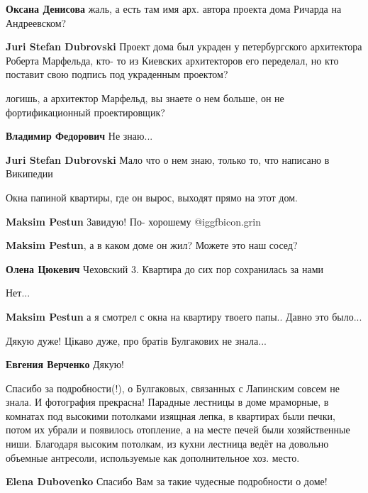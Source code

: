 \begin{itemize}
\begin{itemize}
\textbf{Оксана Денисова} жаль, а есть там имя арх. автора проекта дома Ричарда на Андреевском?

\textbf{Juri Stefan Dubrovski} Проект дома был украден у петербургского архитектора Роберта Марфельда, кто- то из Киевских архитекторов его переделал, но кто поставит свою подпись под украденным проектом?

логишь, а архитектор Марфельд, вы знаете о нем больше, он не фортификационный проектировщик?

\textbf{Владимир Федорович} Не знаю...

\textbf{Juri Stefan Dubrovski} Мало что о нем знаю, только то, что написано в Википедии
\end{itemize} %


Окна папиной квартиры, где он вырос, выходят прямо на этот дом.

\begin{itemize} %
\textbf{Maksim Pestun} Завидую! По- хорошему @igg{fbicon.grin} 

\textbf{Maksim Pestun}, а в каком доме он жил? Можете это наш сосед?

\textbf{Олена Цюкевич} Чеховский 3. Квартира до сих пор сохранилась за нами

Нет...

\textbf{Maksim Pestun} а я смотрел с окна на квартиру твоего папы.. Давно это было...
\end{itemize} %

Дякую дуже!
Цікаво дуже, про братів Булгакових не знала...

\textbf{Евгения Верченко} Дякую!


Спасибо за подробности(!), о Булгаковых, связанных с Лапинским совсем не знала.
И фотография прекрасна! Парадные лестницы в доме мраморные, в комнатах под
высокими потолками изящная лепка, в квартирах были печки, потом их убрали и
появилось отопление, а на месте печей были хозяйственные ниши. Благодаря
высоким потолкам, из кухни лестница ведёт на довольно объемные антресоли,
используемые как дополнительное хоз. место.

\textbf{Elena Dubovenko} Спасибо Вам за такие чудесные подробности о доме!


\end{itemize}
